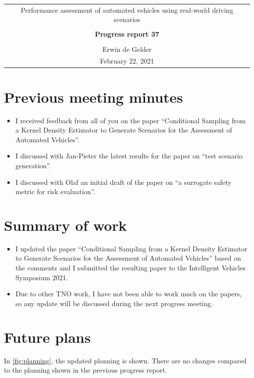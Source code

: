 \documentclass[10pt,final,a4paper,oneside,onecolumn]{article}
\newcommand{\progressreportnumber}{37}
\renewcommand{\author}{Erwin de Gelder}
\renewcommand{\date}{February 22, 2021}
\renewcommand{\title}{Performance assessment of automated vehicles using real-world driving scenarios}
\begin{document}
	
\begin{center}
	\begin{tabular}{c}
		\title \\ \\
		\textbf{\huge Progress report \progressreportnumber} \\ \\
		\author \\ 
		\date
	\end{tabular}
\end{center}

\section{Previous meeting minutes}

\begin{itemize}
	\item I received feedback from all of you on the paper ``Conditional Sampling from a Kernel Density Estimator to Generate Scenarios for the Assessment of Automated Vehicles''.
	\item I discussed with Jan-Pieter the latest results for the paper on ``test scenario generation''.
	\item I discussed with Olaf an initial draft of the paper on ``a surrogate safety metric for risk evaluation''. 
\end{itemize}

\section{Summary of work}

\begin{itemize}
	\item I updated the paper ``Conditional Sampling from a Kernel Density Estimator to Generate Scenarios for the Assessment of Automated Vehicles'' based on the comments and I submitted the resulting paper to the Intelligent Vehicles Symposium 2021. 
	
	\item Due to other TNO work, I have not been able to work much on the papers, so any update will be discussed during the next progress meeting. 
\end{itemize}

\section{Future plans}

In \cref{fig:planning}, the updated planning is shown. There are no changes compared to the planning shown in the previous progress report.
\end{document}
